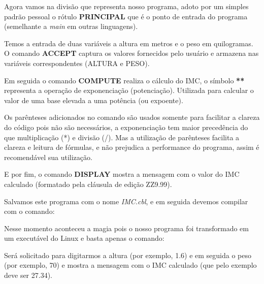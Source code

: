 Agora vamos na divisão que representa nosso programa, adoto por um simples padrão pessoal o rótulo \textbf{PRINCIPAL} que é o ponto de entrada do programa (semelhante a \textit{main} em outras linguagens).

Temos a entrada de duas variáveis a altura em metros e o peso em quilogramas. O comando \textbf{ACCEPT} captura os valores fornecidos pelo usuário e armazena nas variáveis correspondentes (ALTURA e PESO).

Em seguida o comando \textbf{COMPUTE} realiza o cálculo do IMC, o símbolo \textbf{**} representa a operação de exponenciação (potenciação). Utilizada para calcular o valor de uma base elevada a uma potência (ou expoente).

\begin{note}
	Os parênteses adicionados no comando são usados somente para facilitar a clareza do código pois não são necessários, a exponenciação tem maior precedência do que multiplicação (*) e divisão (/). Mas a utilização de parênteses facilita a clareza e leitura de fórmulas, e não prejudica a performance do programa, assim é recomendável sua utilização.
\end{note}
 
E por fim, o comando \textbf{DISPLAY} mostra a mensagem com o valor do IMC calculado (formatado pela cláusula de edição ZZ9.99).

Salvamos este programa com o nome \textit{IMC.cbl}, e em seguida devemos compilar com o comando: \\

Nesse momento aconteceu a magia pois o nosso programa foi transformado em um executável do Linux e basta apenas o comando: \\

Será solicitado para digitarmos a altura (por exemplo, 1.6) e em seguida o peso (por exemplo, 70) e mostra a mensagem com o IMC calculado (que pelo exemplo deve ser 27.34).
\clearpage